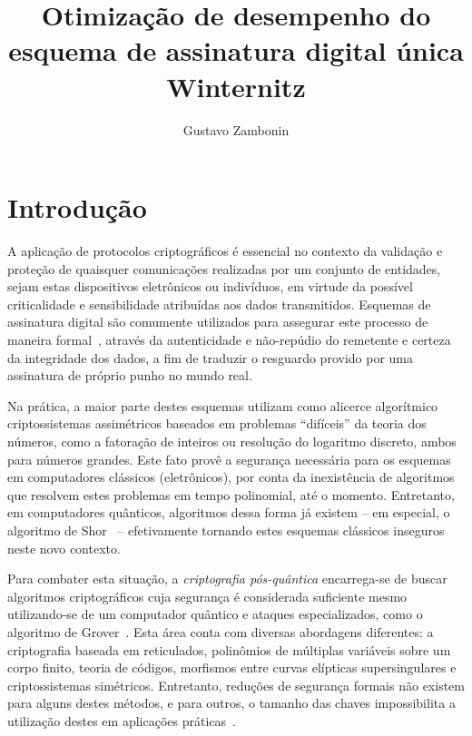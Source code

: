 \documentclass[12pt]{report}
\title{Otimização de desempenho do esquema de assinatura digital única Winternitz}
\author{Gustavo Zambonin}
\date{}
\begin{document}
\maketitle

\tableofcontents

\chapter{Introdução}

A aplicação de protocolos criptográficos é essencial no contexto da validação e
proteção de quaisquer comunicações realizadas por um conjunto de entidades,
sejam estas dispositivos eletrônicos ou indivíduos, em virtude da possível
criticalidade e sensibilidade atribuídas aos dados transmitidos. Esquemas de
assinatura digital são comumente utilizados para assegurar este processo de
maneira formal~\cite{Goldreich:2004:FCV:975541}, através da autenticidade e
não-repúdio do remetente e certeza da integridade dos dados, a fim de
traduzir o resguardo provido por uma assinatura de próprio punho no mundo real.

Na prática, a maior parte destes esquemas utilizam como alicerce algorítmico
criptossistemas assimétricos baseados em problemas ``difíceis'' da teoria
dos números, como a fatoração de inteiros ou resolução do logaritmo discreto,
ambos para números grandes. Este fato provê a segurança necessária para os
esquemas em computadores clássicos (eletrônicos), por conta da inexistência de
algoritmos que resolvem estes problemas em tempo polinomial, até o momento.
Entretanto, em computadores quânticos, algoritmos dessa forma já existem -- em
especial, o algoritmo de Shor~\cite{Shor:1997:PAP:264393.264406} -- efetivamente
tornando estes esquemas clássicos inseguros neste novo contexto.

Para combater esta situação, a \emph{criptografia pós-quântica} encarrega-se de buscar
algoritmos criptográficos cuja segurança é considerada suficiente mesmo
utilizando-se de um computador quântico e ataques especializados, como o
algoritmo de Grover~\cite{Grover:1996:FQM:237814.237866}. Esta área conta com
diversas abordagens diferentes: a criptografia baseada em reticulados,
polinômios de múltiplas variáveis sobre um corpo finito, teoria de códigos,
morfismos entre curvas elípticas supersingulares e criptossistemas simétricos.
Entretanto, reduções de segurança formais não existem para alguns destes
métodos, e para outros, o tamanho das chaves impossibilita a utilização destes
em aplicações práticas~\cite{Bernstein2017}.
\end{document}
